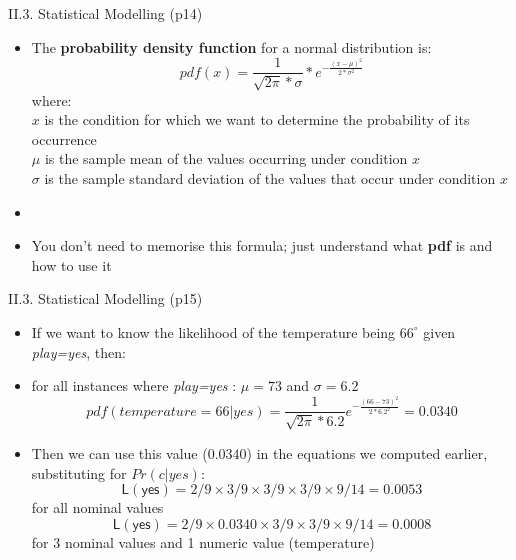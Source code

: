 \documentclass[handout]{beamer}
\newcommand{\stronger}[1]{\textbf{\color{purple} #1}}
\begin{document}
\begin{frame}{II.3. Statistical Modelling (p14)}
\begin{itemize}
\item The \stronger{probability density function} for a normal distribution is:
\[
	pdf(x) = \frac{1}{\sqrt{2\pi}*\sigma}*e^{-\frac{(x-\mu)^2}{2*\sigma^2}}
\]
where:\\
$x$ is the condition for which we want to determine the probability of its occurrence\\
$\mu$ is the sample mean of the values occurring under condition $x$\\
$\sigma$ is the sample standard deviation of the values that occur under condition $x$\\
\item[]
\item You don't need to memorise this formula; just understand what \stronger{pdf} is and how to use it
\end{itemize}
\end{frame}
\begin{frame}{II.3. Statistical Modelling (p15)}
\begin{itemize}
\item If we want to know the likelihood of the temperature being $66^\circ$ given \emph{play=yes}, then:
\item[] for all instances where \emph{play=yes} : $\mu = 73$ and $\sigma = 6.2$
\[
pdf(\mathit{temperature}=66|\mathit{yes}) = \frac{1}{\sqrt{2\pi}*6.2}e^{-\frac{(66-73)^2}{2*6.2^2}} = 0.0340
\]
\item Then we can use this value ($0.0340$) in the equations we computed earlier, substituting for $Pr(c|yes)$:
\[
\mathsf{L(yes)} = 2/9 \times 3/9 \times 3/9 \times 3/9 \times 9/14 = 0.0053 \]
for all nominal values\\

\[
\mathsf{L(yes)} = 2/9 \times 0.0340 \times 3/9 \times 3/9 \times 9/14 = 0.0008
\]
for 3 nominal values and 1 numeric value (temperature)

\end{itemize}
\end{frame}
\end{document}
